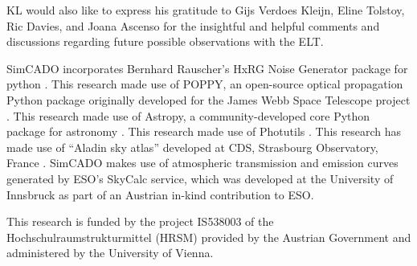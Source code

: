 \begin{acknowledgements}

KL would also like to express his gratitude to Gijs Verdoes Kleijn, Eline Tolstoy, Ric Davies, and Joana Ascenso for the insightful and helpful comments and discussions regarding future possible observations with the ELT.

SimCADO incorporates Bernhard Rauscher's HxRG Noise Generator package for python \citep{nghxrg}. 
This research made use of POPPY, an open-source optical propagation Python package originally developed for the James Webb Space Telescope project \citep{poppy}. 
This research made use of Astropy, a community-developed core Python package for astronomy \citep{astropy, astropy2}. 
This research made use of Photutils \citep{photutils}. 
This research has made use of ``Aladin sky atlas'' developed at CDS, Strasbourg Observatory, France \citep{aladin, aladinlite}.
SimCADO makes use of atmospheric transmission and emission curves generated by ESO's SkyCalc service, which was developed at the University of Innsbruck as part of an Austrian in-kind contribution to ESO. 

This research is funded by the project IS538003 of the Hochschulraumstrukturmittel (HRSM) provided by the Austrian Government and administered by the University of Vienna.

\end{acknowledgements}